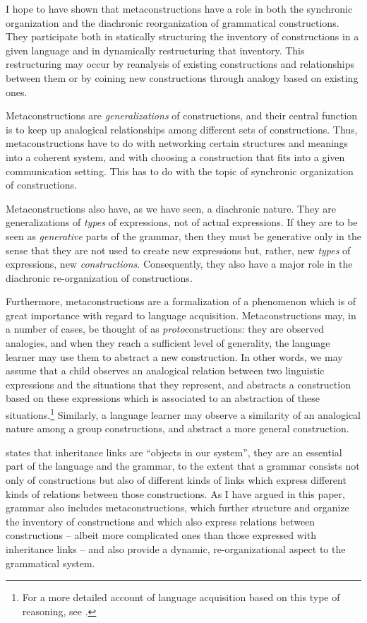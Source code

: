 \documentclass[output=paper, colorlinks,citecolor=brown]{langsci/langscibook}
\begin{document}
I hope to have shown that metaconstructions have a role in both the synchronic organization and the diachronic reorganization of grammatical constructions. They participate both in statically structuring the inventory of constructions in a given language and in dynamically restructuring that inventory. This restructuring may occur by reanalysis of existing constructions and relationships between them or by coining new constructions through analogy based on existing ones.

\begin{sloppypar}
Metaconstructions are \textit{generalizations} of constructions, and their central function is to keep up analogical relationships among different sets of constructions. Thus, metaconstructions have to do with networking certain structures and meanings into a coherent system, and with choosing a construction that fits into a given communication setting. This has to do with the topic of synchronic organization of constructions.
\end{sloppypar}

Metaconstructions also have, as we have seen, a diachronic nature. They are generalizations of \textit{types} of expressions, not of actual expressions. If they are to be seen as \textit{generative} parts of the grammar, then they must be generative only in the sense that they are not used to create new expressions but, rather, new \textit{types} of expressions, new \textit{constructions}. Consequently, they also have a major role in the diachronic re-organization of constructions.

Furthermore, metaconstructions are a formalization of a phenomenon which is of great importance with regard to language acquisition. Metaconstructions may, in a number of cases, be thought of as \textit{proto}constructions: they are observed analogies, and when they reach a sufficient level of generality, the language learner may use them to abstract a new construction. In other words, we may assume that a child observes an analogical relation between two linguistic expressions and the situations that they represent, and abstracts a construction based on these expressions which is associated to an abstraction of these situations.\footnote{For a more detailed account of language acquisition based on this type of reasoning, see \citet{Kauppinen1998, Kauppinen1999}.} Similarly, a language learner may observe a similarity of an analogical nature among a group constructions, and abstract a more general construction.

\citet[75]{Goldberg1995} states that inheritance links are “objects in our system”, they are an essential part of the language and the grammar, to the extent that a grammar consists not only of constructions but also of different kinds of links which express different kinds of relations between those constructions. As I have argued in this paper, grammar also includes metaconstructions, which further structure and organize the inventory of constructions and which also express relations between constructions -- albeit more complicated ones than those expressed with inheritance links -- and also provide a dynamic, re-organizational aspect to the grammatical system.\largerpage
\end{document}

